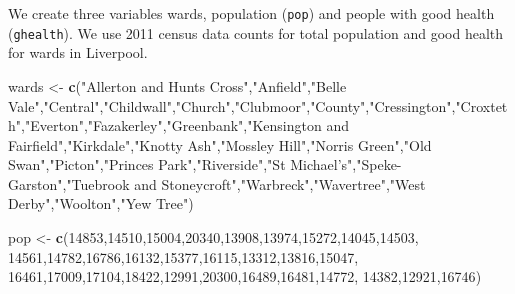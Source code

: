 \documentclass[]{book}
\newenvironment{Shaded}{\begin{snugshade}}{\end{snugshade}}
\newcommand{\DecValTok}[1]{\textcolor[rgb]{0.00,0.00,0.81}{#1}}
\newcommand{\KeywordTok}[1]{\textcolor[rgb]{0.13,0.29,0.53}{\textbf{#1}}}
\newcommand{\NormalTok}[1]{#1}
\newcommand{\StringTok}[1]{\textcolor[rgb]{0.31,0.60,0.02}{#1}}
\begin{document}
We create three variables wards, population (\texttt{pop}) and people with good health (\texttt{ghealth}). We use 2011 census data counts for total population and good health for wards in Liverpool.

\begin{Shaded}
\begin{Highlighting}[]
\NormalTok{wards <-}\StringTok{ }\KeywordTok{c}\NormalTok{(}\StringTok{"Allerton and Hunts Cross"}\NormalTok{,}\StringTok{"Anfield"}\NormalTok{,}\StringTok{"Belle Vale"}\NormalTok{,}\StringTok{"Central"}\NormalTok{,}\StringTok{"Childwall"}\NormalTok{,}\StringTok{"Church"}\NormalTok{,}\StringTok{"Clubmoor"}\NormalTok{,}\StringTok{"County"}\NormalTok{,}\StringTok{"Cressington"}\NormalTok{,}\StringTok{"Croxteth"}\NormalTok{,}\StringTok{"Everton"}\NormalTok{,}\StringTok{"Fazakerley"}\NormalTok{,}\StringTok{"Greenbank"}\NormalTok{,}\StringTok{"Kensington and Fairfield"}\NormalTok{,}\StringTok{"Kirkdale"}\NormalTok{,}\StringTok{"Knotty Ash"}\NormalTok{,}\StringTok{"Mossley Hill"}\NormalTok{,}\StringTok{"Norris Green"}\NormalTok{,}\StringTok{"Old Swan"}\NormalTok{,}\StringTok{"Picton"}\NormalTok{,}\StringTok{"Princes Park"}\NormalTok{,}\StringTok{"Riverside"}\NormalTok{,}\StringTok{"St Michael's"}\NormalTok{,}\StringTok{"Speke-Garston"}\NormalTok{,}\StringTok{"Tuebrook and Stoneycroft"}\NormalTok{,}\StringTok{"Warbreck"}\NormalTok{,}\StringTok{"Wavertree"}\NormalTok{,}\StringTok{"West Derby"}\NormalTok{,}\StringTok{"Woolton"}\NormalTok{,}\StringTok{"Yew Tree"}\NormalTok{)}

\NormalTok{pop <-}\StringTok{ }\KeywordTok{c}\NormalTok{(}\DecValTok{14853}\NormalTok{,}\DecValTok{14510}\NormalTok{,}\DecValTok{15004}\NormalTok{,}\DecValTok{20340}\NormalTok{,}\DecValTok{13908}\NormalTok{,}\DecValTok{13974}\NormalTok{,}\DecValTok{15272}\NormalTok{,}\DecValTok{14045}\NormalTok{,}\DecValTok{14503}\NormalTok{,}
                \DecValTok{14561}\NormalTok{,}\DecValTok{14782}\NormalTok{,}\DecValTok{16786}\NormalTok{,}\DecValTok{16132}\NormalTok{,}\DecValTok{15377}\NormalTok{,}\DecValTok{16115}\NormalTok{,}\DecValTok{13312}\NormalTok{,}\DecValTok{13816}\NormalTok{,}\DecValTok{15047}\NormalTok{,}
                \DecValTok{16461}\NormalTok{,}\DecValTok{17009}\NormalTok{,}\DecValTok{17104}\NormalTok{,}\DecValTok{18422}\NormalTok{,}\DecValTok{12991}\NormalTok{,}\DecValTok{20300}\NormalTok{,}\DecValTok{16489}\NormalTok{,}\DecValTok{16481}\NormalTok{,}\DecValTok{14772}\NormalTok{,}
                \DecValTok{14382}\NormalTok{,}\DecValTok{12921}\NormalTok{,}\DecValTok{16746}\NormalTok{)}


\end{Highlighting}
\end{Shaded}
\end{document}
